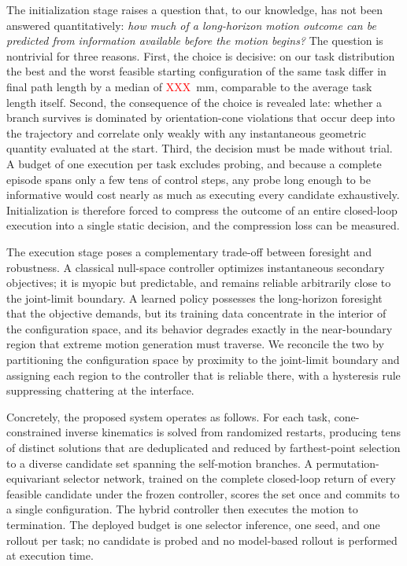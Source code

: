 \documentclass[journal]{IEEEtran}
\newcommand{\ph}[1]{\textcolor{red}{#1}}          %
\newcommand{\phSpreadE}{\ph{XXX}}            %
\begin{document}
The initialization stage raises a question that, to our knowledge, has
not been answered quantitatively: \emph{how much of a long-horizon motion
outcome can be predicted from information available before the motion
begins?} The question is nontrivial for three reasons. First, the choice
is decisive: on our task distribution the best and the worst feasible
starting configuration of the same task differ in final path length by a
median of \phSpreadE~mm, comparable to the average task length itself.
Second, the consequence of the choice is revealed late: whether a branch
survives is dominated by orientation-cone violations that occur deep into
the trajectory and correlate only weakly with any instantaneous geometric
quantity evaluated at the start. Third, the decision must be made without
trial. A budget of one execution per task excludes probing, and because a
complete episode spans only a few tens of control steps, any probe long
enough to be informative would cost nearly as much as executing every
candidate exhaustively. Initialization is therefore forced to compress
the outcome of an entire closed-loop execution into a single static
decision, and the compression loss can be measured.

The execution stage poses a complementary trade-off between foresight and
robustness. A classical null-space controller optimizes instantaneous
secondary objectives; it is myopic but predictable, and remains reliable
arbitrarily close to the joint-limit boundary. A learned policy possesses
the long-horizon foresight that the objective demands, but its training
data concentrate in the interior of the configuration space, and its
behavior degrades exactly in the near-boundary region that extreme motion
generation must traverse. We reconcile the two by partitioning the
configuration space by proximity to the joint-limit boundary and
assigning each region to the controller that is reliable there, with a
hysteresis rule suppressing chattering at the interface.

Concretely, the proposed system operates as follows. For each task,
cone-constrained inverse kinematics is solved from randomized restarts,
producing tens of distinct solutions that are deduplicated and reduced by
farthest-point selection to a diverse candidate set spanning the
self-motion branches. A permutation-equivariant selector network, trained
on the complete closed-loop return of every feasible candidate under the
frozen controller, scores the set once and commits to a single
configuration. The hybrid controller then executes the motion to
termination. The deployed budget is one selector inference, one seed, and
one rollout per task; no candidate is probed and no model-based rollout
is performed at execution time.
\end{document}
